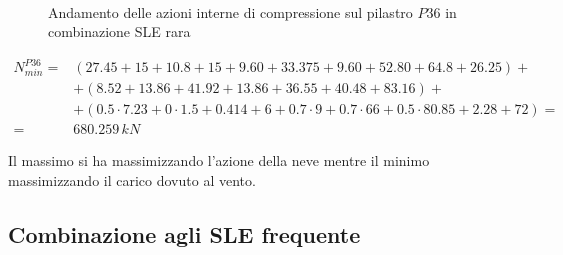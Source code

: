 \begin{figure}
	\centering
	\\
	\caption{Andamento delle azioni interne di compressione sul pilastro $P36$ in combinazione SLE rara}
	\label{fig:P36axialLoad_sleRara}
\end{figure}

\begin{align*}
	N_{min}^{P36} =& (27.45 + 15+10.8 + 15+9.60 + 33.375+9.60+52.80+64.8+26.25)+\\
	&+(8.52+13.86+41.92+13.86+36.55+40.48+83.16)+\\
	&+(0.5\cdot7.23+0\cdot1.5+0.414+6+0.7\cdot9+0.7\cdot66+0.5\cdot80.85+2.28+72)=\\
	=& 680.259\,kN
\end{align*}

Il massimo si ha massimizzando l'azione della neve mentre il minimo massimizzando il carico dovuto al vento.

\subsection{Combinazione agli SLE frequente}

